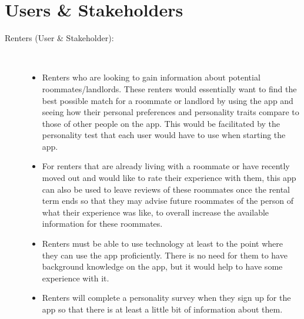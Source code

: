 \documentclass{article}
\begin{document}
\section{Users \& Stakeholders}
\begin{description}
    \item[Renters (User \& Stakeholder):]
    \newline \,
    \begin{itemize}
        \item Renters who are looking to gain information about potential roommates/landlords. 
        These renters would essentially want to find the best possible match for a roommate or  
        landlord by using the app and seeing how their personal preferences and personality traits
        compare to those of other people on the app. This would be facilitated by the personality 
        test that each user would have to use when starting the app. 
        \item For renters that are already living with a roommate or have recently moved out and 
        would like to rate their experience with them, this app can also be used to leave reviews 
        of these roommates once the rental term ends so that they may advise future roommates of 
        the person of what their experience was like, to overall increase the available 
        information for these roommates. 
        \item Renters must be able to use technology at least to the point where they can use the 
        app proficiently. There is no need for them to have background knowledge on the app, but 
        it would help to have some experience with it. 
        \item Renters will complete a personality survey when they sign up for the app so that 
        there is at least a little bit of information about them. 
    \end{itemize}
    

\end{description}
\end{document}
